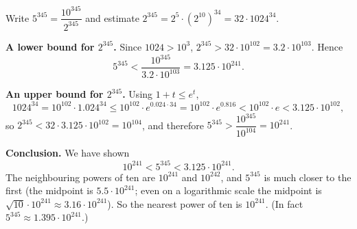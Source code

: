 Write $5^{345}=\dfrac{10^{345}}{2^{345}}$ and estimate $2^{345}=2^5\cdot\left(2^{10}\right)^{34}=32\cdot1024^{34}$.

\textbf{A lower bound for $2^{345}$.} Since $1024>10^3$, $2^{345}>32\cdot10^{102}=3.2\cdot10^{103}$. Hence
\[
5^{345}<\dfrac{10^{345}}{3.2\cdot10^{103}}=3.125\cdot10^{241}.
\]

\textbf{An upper bound for $2^{345}$.} Using $1+t\le e^t$,
\[
1024^{34}=10^{102}\cdot1.024^{34}\le10^{102}\cdot e^{0.024\cdot34}=10^{102}\cdot e^{0.816}<10^{102}\cdot e<3.125\cdot10^{102},
\]
so $2^{345}<32\cdot3.125\cdot10^{102}=10^{104}$, and therefore $5^{345}>\dfrac{10^{345}}{10^{104}}=10^{241}$.

\textbf{Conclusion.} We have shown
\[
10^{241}<5^{345}<3.125\cdot10^{241}.
\]
The neighbouring powers of ten are $10^{241}$ and $10^{242}$, and $5^{345}$ is much closer to the first (the midpoint is $5.5\cdot10^{241}$; even on a logarithmic scale the midpoint is $\sqrt{10}\cdot10^{241}\approx3.16\cdot10^{241}$). So the nearest power of ten is $\boxed{10^{241}}$. (In fact $5^{345}\approx1.395\cdot10^{241}$.)

